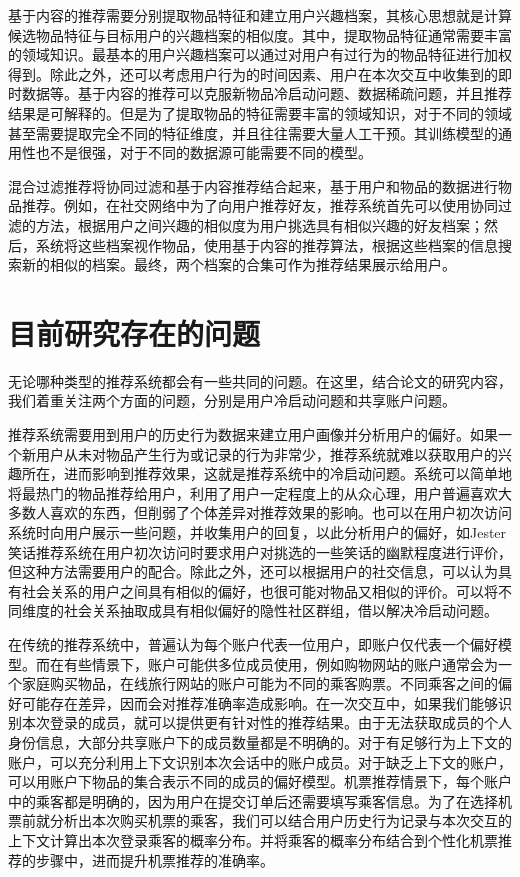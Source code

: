 基于内容的推荐需要分别提取物品特征和建立用户兴趣档案，其核心思想就是计算候选物品特征与目标用户的兴趣档案的相似度。其中，提取物品特征通常需要丰富的领域知识。最基本的用户兴趣档案可以通过对用户有过行为的物品特征进行加权得到。除此之外，还可以考虑用户行为的时间因素、用户在本次交互中收集到的即时数据等。基于内容的推荐可以克服新物品冷启动问题、数据稀疏问题，并且推荐结果是可解释的。但是为了提取物品的特征需要丰富的领域知识，对于不同的领域甚至需要提取完全不同的特征维度，并且往往需要大量人工干预。其训练模型的通用性也不是很强，对于不同的数据源可能需要不同的模型。

混合过滤推荐将协同过滤和基于内容推荐结合起来，基于用户和物品的数据进行物品推荐。例如，在社交网络中为了向用户推荐好友，推荐系统首先可以使用协同过滤的方法，根据用户之间兴趣的相似度为用户挑选具有相似兴趣的好友档案；然后，系统将这些档案视作物品，使用基于内容的推荐算法，根据这些档案的信息搜索新的相似的档案。最终，两个档案的合集可作为推荐结果展示给用户。

\section{目前研究存在的问题}

无论哪种类型的推荐系统都会有一些共同的问题。在这里，结合论文的研究内容，我们着重关注两个方面的问题，分别是用户冷启动问题和共享账户问题。

推荐系统需要用到用户的历史行为数据来建立用户画像并分析用户的偏好。如果一个新用户从未对物品产生行为或记录的行为非常少，推荐系统就难以获取用户的兴趣所在，进而影响到推荐效果，这就是推荐系统中的冷启动问题。系统可以简单地将最热门的物品推荐给用户，利用了用户一定程度上的从众心理，用户普遍喜欢大多数人喜欢的东西，但削弱了个体差异对推荐效果的影响。也可以在用户初次访问系统时向用户展示一些问题，并收集用户的回复，以此分析用户的偏好，如Jester笑话推荐系统在用户初次访问时要求用户对挑选的一些笑话的幽默程度进行评价，但这种方法需要用户的配合。除此之外，还可以根据用户的社交信息，可以认为具有社会关系的用户之间具有相似的偏好，也很可能对物品又相似的评价。可以将不同维度的社会关系抽取成具有相似偏好的隐性社区群组，借以解决冷启动问题。

在传统的推荐系统中，普遍认为每个账户代表一位用户，即账户仅代表一个偏好模型。而在有些情景下，账户可能供多位成员使用，例如购物网站的账户通常会为一个家庭购买物品，在线旅行网站的账户可能为不同的乘客购票。不同乘客之间的偏好可能存在差异，因而会对推荐准确率造成影响。在一次交互中，如果我们能够识别本次登录的成员，就可以提供更有针对性的推荐结果。由于无法获取成员的个人身份信息，大部分共享账户下的成员数量都是不明确的。对于有足够行为上下文的账户，可以充分利用上下文识别本次会话中的账户成员。对于缺乏上下文的账户，可以用账户下物品的集合表示不同的成员的偏好模型。机票推荐情景下，每个账户中的乘客都是明确的，因为用户在提交订单后还需要填写乘客信息。为了在选择机票前就分析出本次购买机票的乘客，我们可以结合用户历史行为记录与本次交互的上下文计算出本次登录乘客的概率分布。并将乘客的概率分布结合到个性化机票推荐的步骤中，进而提升机票推荐的准确率。



